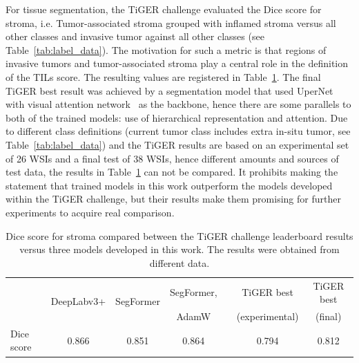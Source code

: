 For tissue segmentation, the TiGER challenge evaluated the Dice score for stroma,
i.e. Tumor-associated stroma grouped with inflamed stroma versus all other classes
and invasive tumor against all other classes (see Table~\ref{tab:label_data}). 
The motivation for such a metric is that regions of invasive tumors and 
tumor-associated stroma play a central role in the definition of the TILs score.
The resulting values are registered in Table~\ref{tab:tissue_compare}. 
The final TiGER best result was achieved by a segmentation model that used
UperNet~\cite{xiao2018unified} with visual attention network~\cite{guo2022visual}
as the backbone, hence there are some parallels to both of the trained models:
use of hierarchical representation and attention.
Due to different class definitions (current tumor class includes extra in-situ tumor,
see Table~\ref{tab:label_data}) and the TiGER results are based on an experimental
set of 26 WSIs and a final test of 38 WSIs, hence different amounts and sources of
test data, the results in Table~\ref{tab:tissue_compare} can not be compared.
It prohibits making the statement that trained models in this work outperform the models
developed within the TiGER challenge, but their results make them promising for
further experiments to acquire real comparison.

\begin{table}[h!]
    \centering
    \begin{tabular}{ l c c c c c c }
        \hline
         & \multirow{2}{*}{DeepLabv3+} & \multirow{2}{*}{SegFormer} & SegFormer, & & TiGER best & TiGER best\\
         &  &  & AdamW & & (experimental) & (final)\\
        \hline
        Dice score & 0.866 & 0.851 & 0.864 & & 0.794 & 0.812 \\
        \hline
    \end{tabular}
\caption{\label{tab:tissue_compare} Dice score for stroma compared between the TiGER challenge leaderboard
results versus three models developed in this work. The results were obtained from different data.}
\end{table}

